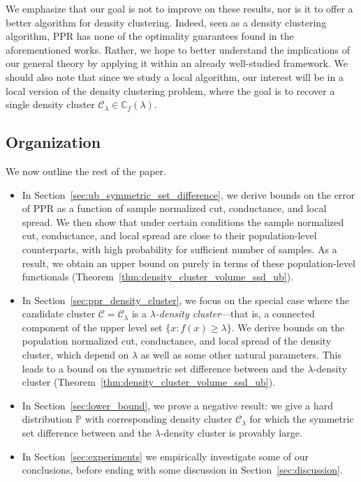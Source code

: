 \documentclass[twoside,11pt]{article}
\newcommand{\1}{\mathbf{1}}
\newcommand{\mc}[1]{\mathcal{#1}}
\newcommand{\mbb}[1]{\mathbb{#1}}
\newcommand{\Pbb}{\mathbb{P}}
\newcommand{\wh}[1]{\widehat{#1}}
\newcommand{\vol}{\mathrm{vol}}
\begin{document}
We emphasize that our goal is not to improve on these results, nor is it to offer a better algorithm for density clustering. Indeed, seen as a density clustering algorithm, PPR has none of the optimality guarantees found in the aforementioned works. Rather, we hope to better understand the implications of our general theory by applying it within an already well-studied framework. We should also note that since we study a local algorithm, our interest will be in a local version of the density clustering problem, where the goal is to recover a single density cluster $\mc{C}_{\lambda} \in \mbb{C}_f(\lambda)$. 

\subsection{Organization}
We now outline the rest of the paper.
\begin{itemize}
	\item In Section~\ref{sec:ub_symmetric_set_difference}, we derive bounds on the error of PPR as a function of sample normalized cut, conductance, and local spread. We then show that under certain conditions the sample normalized cut, conductance, and local spread are close to their population-level counterparts, with high probability for sufficient number of samples. As a result, we obtain an upper bound on \smash{$\Delta(\wh{C},\mc{C}[X])/\vol_{n,r}(\mc{C}[X])$} purely in terms of these population-level functionals (Theorem~\ref{thm:density_cluster_volume_ssd_ub}).
	\item In Section~\ref{sec:ppr_density_cluster}, we focus on the special case where the candidate cluster $\mc{C} = \mc{C}_{\lambda}$ is a \emph{$\lambda$-density cluster}---that is, a connected component of the upper level set $\{x: f(x) \geq \lambda\}$. We derive bounds on the population normalized cut, conductance, and local spread of the density cluster, which depend on $\lambda$ as well as some other natural parameters. This leads to a bound on the symmetric set difference between \smash{$\wh{C}$} and the $\lambda$-density cluster (Theorem~\ref{thm:density_cluster_volume_ssd_ub}).
	\item In Section~\ref{sec:lower_bound}, we prove a negative result: we give a hard distribution $\Pbb$ with corresponding density cluster $\mc{C}_{\lambda}$ for which the symmetric set difference between \smash{$\wh{C}$} and the $\lambda$-density cluster is provably large.
	\item In Section~\ref{sec:experiments} we empirically investigate some of our conclusions, before ending with some discussion in Section~\ref{sec:discussion}.
\end{itemize}
\end{document}
